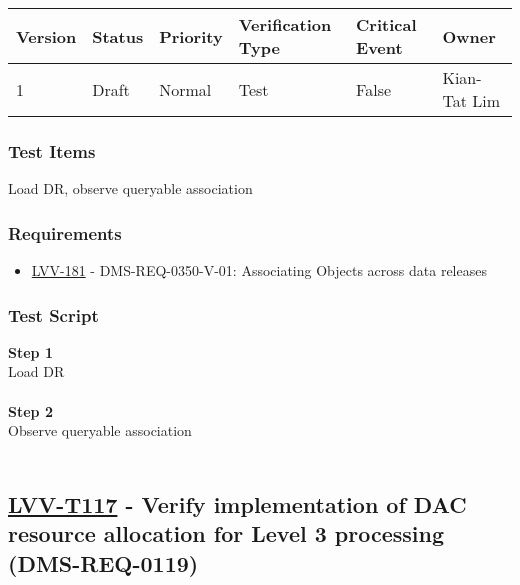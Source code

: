 \begin{longtable}[]{@{}llllll@{}}
\toprule
Version & Status & Priority & Verification Type & Critical Event &
Owner\tabularnewline
\midrule
\endhead
1 & Draft & Normal & Test & False & Kian-Tat Lim\tabularnewline
\bottomrule
\end{longtable}

\hypertarget{test-items-92}{%
\subsubsection{Test Items}\label{test-items-92}}

Load DR, observe queryable association

\hypertarget{requirements-93}{%
\subsubsection{Requirements}\label{requirements-93}}

\begin{itemize}
\tightlist
\item
  \href{https://jira.lsstcorp.org/browse/LVV-181}{LVV-181} -
  DMS-REQ-0350-V-01: Associating Objects across data releases
\end{itemize}

\hypertarget{test-script-93}{%
\subsubsection{Test Script}\label{test-script-93}}

\textbf{Step 1}\\
Load DR\\
~\\
\textbf{Step 2}\\
Observe queryable association\\
~\\

\hypertarget{lvv-t117---verify-implementation-of-dac-resource-allocation-for-level-3-processing-dms-req-0119}{%
\subsection{\texorpdfstring{\href{https://jira.lsstcorp.org/secure/Tests.jspa\#/testCase/LVV-T117}{LVV-T117}
- Verify implementation of DAC resource allocation for Level 3
processing
(DMS-REQ-0119)}{LVV-T117 - Verify implementation of DAC resource allocation for Level 3 processing (DMS-REQ-0119)}}\label{lvv-t117---verify-implementation-of-dac-resource-allocation-for-level-3-processing-dms-req-0119}}

